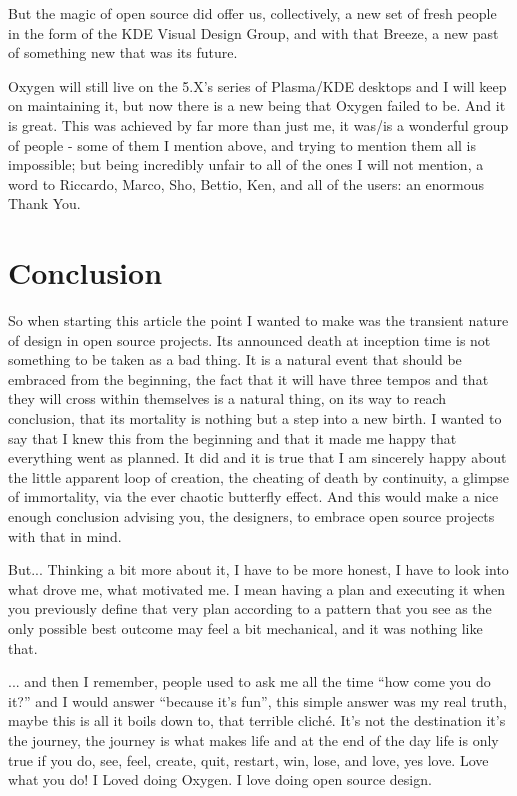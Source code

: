 But the magic of open source did offer us, collectively, a new set of fresh people in the form of the KDE Visual Design Group, and with that Breeze, a new past of something new that was its future.

Oxygen will still live on the 5.X's series of Plasma/KDE desktops and I will keep on maintaining it, but now there is a new being that Oxygen failed to be. And it is great.
This was achieved by far more than just me, it was/is a wonderful group of people - some of them I mention above, and trying to mention them all is impossible; but being incredibly unfair to all of the ones I will not mention, a word to Riccardo, Marco, Sho, Bettio, Ken, and all of the users: an enormous Thank You. 

\section*{Conclusion}
So when starting this article the point I wanted to make was the transient nature of design in open source projects. Its announced death at inception time is not something to be taken as a bad thing. It is a natural event that should be embraced from the beginning, the fact that it will have three tempos and that they will cross within themselves is a natural thing, on its way to reach conclusion, that its mortality is nothing but a step into a new birth.
I wanted to say that I knew this from the beginning and that it made me happy that everything went as planned. It did and it is true that I am sincerely happy about the little apparent loop of creation, the cheating of death by continuity, a glimpse of immortality, via the ever chaotic butterfly effect. And this would make a nice enough conclusion advising you, the designers, to embrace open source projects with that in mind.

But... Thinking a bit more about it, I have to be more honest, I have to look into what drove me, what motivated me. I mean having a plan and executing it when you previously define that very plan according to a pattern that you see as the only possible best outcome may feel a bit mechanical, and it was nothing like that.

... and then I remember, people used to ask me all the time “how come you do it?” and I would answer “because it's fun”, this simple answer was my real truth, maybe this is all it boils down to, that terrible cliché. It's not the destination it's the journey, the journey is what makes life and at the end of the day life is only true if you do, see, feel, create, quit, restart, win, lose, and love, yes love. Love what you do! I Loved doing Oxygen. I love doing open source design.
